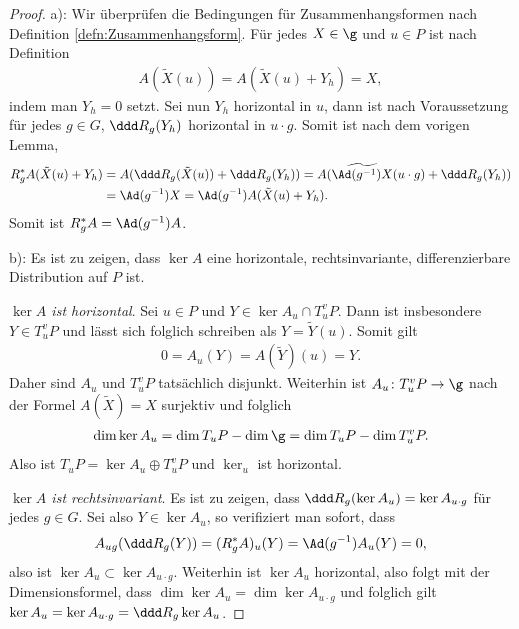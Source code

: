 \documentclass[%
	paper=a5,%
	fleqn,%
	DIV=18,%
	BCOR=0mm,
	fontsize=11pt,
	titlepage=false,%
	bibliography=totoc,
	DIV=18,%
	twoside=true,
	pdftitle=Riemannsche Geometrie,
	pdfauthor=Uwe Semmelmann,
	numbers=noendperiod]%
	{scrbook}
\begin{document}
\begin{proof}
a): Wir überprüfen die Bedingungen für Zusammenhangsformen nach Definition
\ref{defn:Zusammenhangsform}. Für jedes $X\in \g$ und $u\in P$ ist nach
Definition
\begin{align*}
A(\tilde{X}(u)) = A(\tilde{X}(u)+Y_h) = X,
\end{align*}
indem man $Y_h = 0$ setzt. Sei nun $Y_h$ horizontal in $u$, dann ist nach
Voraussetzung für jedes $g\in G$, $\ddd R_g(Y_h)$ horizontal in $u\cdot g$.
Somit ist nach dem vorigen Lemma,
\begin{align*}
R_g^* A(\tilde{X}(u)+Y_h) &= 
A(\ddd R_g (\tilde{X}(u)) + \ddd R_g (Y_h))
= A(\widetilde{\Ad(g^{-1})X}(u\cdot g) + \ddd R_g (Y_h))\\
&= \Ad(g^{-1})X
= \Ad(g^{-1})A(\tilde{X}(u) + Y_h).
\end{align*}
Somit ist $R_g^* A = \Ad(g^{-1})A$.

b): Es ist zu zeigen, dass $\ker A$ eine horizontale, rechtsinvariante,
differenzierbare Distribution auf $P$ ist.

\textit{$\ker A$ ist horizontal}. Sei $u\in P$ und $Y\in \ker A_u\cap T^v_uP$.
Dann ist insbesondere $Y\in T^v_uP$ und lässt sich folglich schreiben als
$Y=\tilde{Y}(u)$. Somit gilt
\begin{align*}
0 = A_u(Y) = A(\tilde{Y})(u) = Y.  
\end{align*}
Daher sind $A_u$ und $T^v_uP$ tatsächlich
disjunkt. Weiterhin ist $A_u\colon T^v_uP \to \g$ nach der Formel $A(\tilde{X}) =
X$ surjektiv und folglich
\begin{align*}
\dim \ker A_u = \dim T_uP - \dim \g = \dim T_uP - \dim T^v_uP.
\end{align*}
Also ist $T_uP = \ker A_u\oplus T^v_uP$ und $\ker_u$ ist horizontal.

\textit{$\ker A$ ist rechtsinvariant}. Es ist zu zeigen, dass $\ddd R_g(\ker
A_u) = \ker A_{u\cdot g}$ für jedes $g\in
G$. Sei also $Y\in \ker A_u$, so verifiziert man sofort, dass
\begin{align*}
A_{ug}(\ddd R_g(Y)) = (R_g^* A)_u(Y)
= \Ad(g^{-1})A_u(Y) = 0,
\end{align*}
also ist $\ker A_u \subset \ker A_{u\cdot g}$. Weiterhin ist $\ker A_u$
horizontal, also folgt mit der Dimensionsformel, dass $\dim \ker A_u = \dim
\ker A_{u\cdot g}$ und folglich gilt $\ker A_u = \ker A_{u\cdot g} = \ddd
R_{g} \ker A_u$.


\end{proof}
\end{document}
